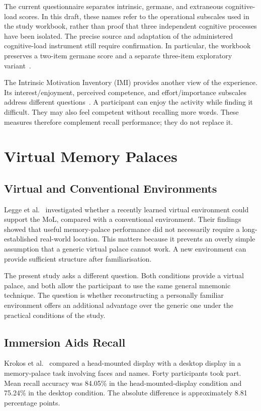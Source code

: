 The current questionnaire separates intrinsic, germane, and extraneous cognitive-load scores. In this draft, these names refer to the operational subscales used in the study workbook, rather than proof that three independent cognitive processes have been isolated. The precise source and adaptation of the administered cognitive-load instrument still require confirmation. In particular, the workbook preserves a two-item germane score and a separate three-item exploratory variant~\cite{srooranalysis}.

The Intrinsic Motivation Inventory (IMI) provides another view of the experience. Its interest/enjoyment, perceived competence, and effort/importance subscales address different questions~\cite{imi}. A participant can enjoy the activity while finding it difficult. They may also feel competent without recalling more words. These measures therefore complement recall performance; they do not replace it.

\section{Virtual Memory Palaces}
\subsection{Virtual and Conventional Environments}
Legge et al.~\cite{legge2012} investigated whether a recently learned virtual environment could support the MoL, compared with a conventional environment. Their findings showed that useful memory-palace performance did not necessarily require a long-established real-world location. This matters because it prevents an overly simple assumption that a generic virtual palace cannot work. A new environment can provide sufficient structure after familiarisation.

The present study asks a different question. Both conditions provide a virtual palace, and both allow the participant to use the same general mnemonic technique. The question is whether reconstructing a personally familiar environment offers an additional advantage over the generic one under the practical conditions of the study.

\subsection{Immersion Aids Recall}
Krokos et al.~\cite{krokos2019} compared a head-mounted display with a desktop display in a memory-palace task involving faces and names. Forty participants took part. Mean recall accuracy was 84.05\% in the head-mounted-display condition and 75.24\% in the desktop condition. The absolute difference is approximately 8.81 percentage points.

